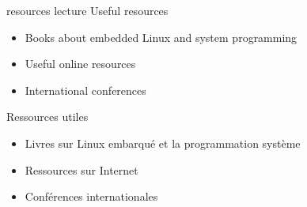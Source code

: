 {resources}
{lecture}
{Useful resources}
{
  \begin{itemize}
  \item Books about embedded Linux and system programming
  \item Useful online resources
  \item International conferences
  \end{itemize}
}
{Ressources utiles}
{
  \begin{itemize}
  \item Livres sur Linux embarqué et la programmation système
  \item Ressources sur Internet
  \item Conférences internationales
  \end{itemize}
}

\def \feshowboards{
    \ifthenelse{\equal{\agendalanguage}{french}}{
      \section{Plateforme matérielle pour les travaux pratiques}
    }{
      \section{Hardware platform for practical labs}
    }

  \showboarditem{stm32mp1}
  \showboarditem{beagleboneblack}
  \showboarditem{beagleplay}
  \newpage
}

\def \onlineagenda {
  \ifthenelse{\equal{\agendalanguage}{french}}{
    \section{Programme de la formation}
  }{
    \section{Training Schedule}
  }
  \begin{tabularx}{\textwidth}{p{2cm}p{5cm}p{11cm}}
  \showagendaday{1}
  \showagendaitem{intro}{lecture}
  \showagendaitem{crosscompile}{lecture}
  \showagendaitem{crosscompile}{lab}
  \showagendaitem{bootprocess}{lecture}
  \showagendaday{2}
  \showagendaitem{uboot}{lab}
  \showagendaitem{kernel}{lecture}
  \showagendaitem{fetchkernel}{lab}
  \showagendaitem{configurekernel}{lecture}
  \showagendaitem{compilekernel}{lab}
  \showagendaday{3}
  \showagendaitem{rootfs}{lecture}
  \showagendaitem{busybox}{lecture}
  \showagendaitem{busybox}{lab}
  \showagendaday{4}
  \showagendaitem{accessinghardware}{lecture}
  \showagendaitem{accessinghardware}{lab}
  \showagendaitem{blockfs}{lecture}
  \showagendaitem{blockfs}{lab}
  \showagendaday{5}
  \showagendaitem{flashfs}{lecture}
  \showagendaitem{crosscompileapp}{lecture}
  \showagendaitem{crosscompileapp}{lab}
  \showagendaday{6}
  \showagendaitem{buildsystem}{lecture}
  \showagendaitem{buildroot}{lab}
  \showagendaitem{license}{lecture}
  \showagendaitem{opensourcelinuxsoftwarestacks}{lecture}
  \showagendaday{7}
  \showagendaitem{integration}{lab}
  \showagendaitem{debugging}{lecture}
  \showagendaitem{debugging}{lab}
  \showagendaitem{resources}{lecture}
  \end{tabularx}
}

